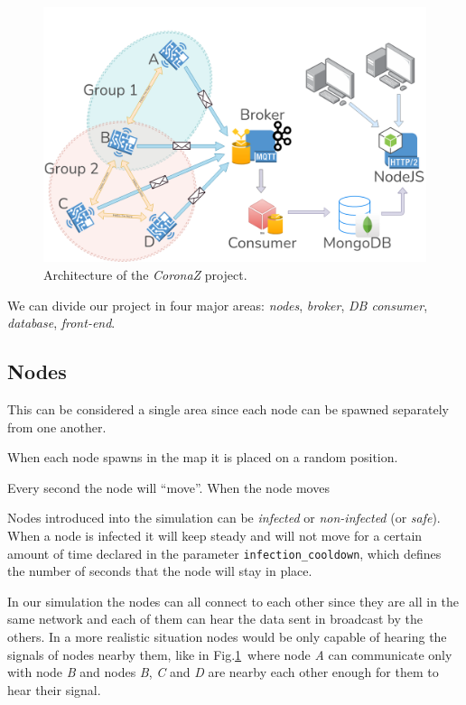 \documentclass[conference]{IEEEtran}
\begin{document}
	\begin{figure}[htbp]
		\centerline{\includegraphics[width=\linewidth]{img/coronaz.png}}
		\caption{Architecture of the \textit{CoronaZ} project.}
		\label{fig:architecture}
	\end{figure}
	
	We can divide our project in four major areas: \textit{nodes}, \textit{broker}, \textit{DB consumer}, \textit{database}, \textit{front-end}.

	\subsection{Nodes}
	
		This can be considered a single area since each node can be spawned separately from one another.
		
		When each node spawns in the map it is placed on a random position.
		
		Every second the node will ``move''.
		When the node moves
		
		Nodes introduced into the simulation can be \textit{infected} or \textit{non-infected} (or \textit{safe}).
		When a node is infected it will keep steady and will not move for a certain amount of time declared in the parameter \texttt{infection\_cooldown}, which defines the number of seconds that the node will stay in place.
		
		In our simulation the nodes can all connect to each other since they are all in the same network and each of them can hear the data sent in broadcast by the others.
		In a more realistic situation nodes would be only capable of hearing the signals of nodes nearby them, like in Fig.\ref{fig:architecture}~where node \textit{A} can communicate only with node \textit{B} and nodes \textit{B}, \textit{C} and \textit{D} are nearby each other enough for them to hear their signal.
\end{document}
